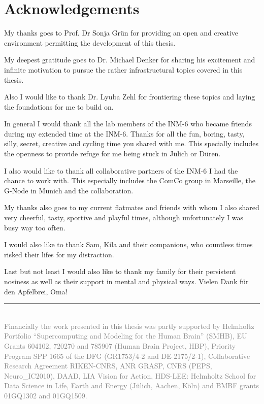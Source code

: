 \cleardoublepage
\pagestyle{plain}
\section*{Acknowledgements}

My thanks goes to Prof. Dr Sonja Grün for providing an open and creative environment permitting the development of this thesis.\newline

My deepest gratitude goes to Dr. Michael Denker for sharing his excitement and infinite motivation to pursue the rather infrastructural topics covered in this thesis.\newline

Also I would like to thank Dr. Lyuba Zehl for frontiering these topics and laying the foundations for me to build on.\newline

In general I would thank all the lab members of the INM-6 who became friends during my extended time at the INM-6. Thanks for all the fun, boring, tasty, silly, secret, creative and cycling time you shared with me. This specially includes the openness to provide refuge for me being stuck in Jülich or Düren.\newline

I also would like to thank all collaborative partners of the INM-6 I had the chance to work with. This especially includes the ComCo group in Marseille, the G-Node in Munich and the  collaboration.\newline

My thanks also goes to my current flatmates and friends with whom I also shared very cheerful, tasty, sportive and playful times, although unfortunately I was busy way too often.\newline

I would also like to thank Sam, Kila and their companions, who countless times risked their lifes for my distraction.
\newline

Last but not least I would also like to thank my family for their persistent nosiness as well as their support in mental and physical ways. Vielen Dank für den Apfelbrei, Oma!\newline

\vfill
\textcolor{gray}{\rule{0.3\textwidth}{0.4pt}\\
\smaller
Financially the work presented in this thesis was partly supported by Helmholtz Portfolio “Supercomputing and Modeling for the Human Brain” (SMHB), EU Grants 604102, 720270 and 785907 (Human Brain Project, HBP), Priority Program SPP 1665 of the DFG (GR1753/4-2 and DE 2175/2-1), Collaborative Research Agreement RIKEN-CNRS, ANR GRASP, CNRS (PEPS, Neuro\_IC2010), DAAD, LIA Vision for Action, HDS-LEE: Helmholtz School for Data Science in Life, Earth and Energy (Jülich, Aachen, Köln) and BMBF grants 01GQ1302 and 01GQ1509.}
